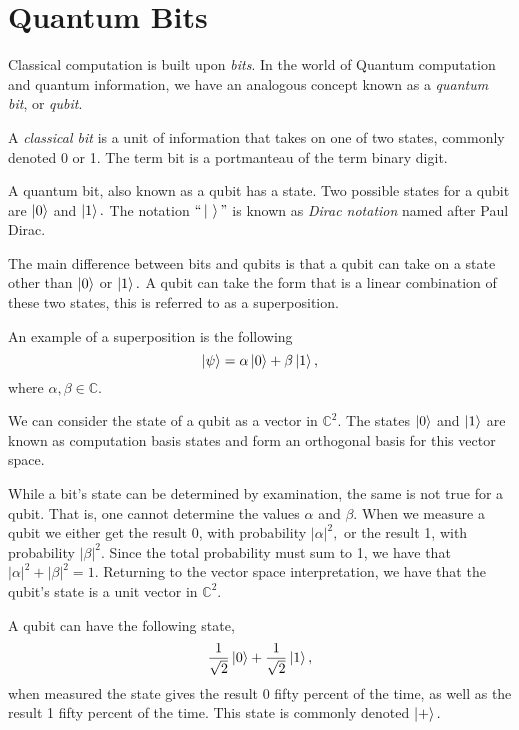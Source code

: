 \section{Quantum Bits}

Classical computation is built upon \textit{bits}. In the world of Quantum computation and quantum information, we have an analogous concept known as a \textit{quantum bit}, or \textit{qubit}.

\begin{definition}
	A \textit{classical bit} is a unit of information that takes on one of two states, commonly denoted 0 or 1. The term bit is a portmanteau of the term binary digit.
\end{definition}

\begin{definition}
	A quantum bit, also known as a qubit has a state. Two possible states for a qubit are $ \ket{0} $ and $ \ket{1}. $ The notation $ ``\ket{  \ }" $ is known as \textit{Dirac notation} named after Paul Dirac.
\end{definition}

The main difference between bits and qubits is that a qubit can take on a state other than $ \ket{0} $ or $ \ket{1}. $ A qubit can take the form that is a linear combination of these two states, this is referred to as a superposition.

An example of a superposition is the following
\begin{equation}\label{superpos_eq}
\ket{\psi} = \alpha \ket{0} + \beta \ket{1},
\end{equation}
where $ \alpha, \beta \in \mathbb{C}. $

We can consider the state of a qubit as a vector in $ \mathbb{C}^2. $ The states $ \ket{0} $ and $ \ket{1} $ are known as computation basis states and form an orthogonal basis for this vector space.

While a bit's state can be determined by examination, the same is not true for a qubit. That is, one cannot determine the values $ \alpha $ and $ \beta. $ When we measure a qubit we either get the result 0, with probability $ \left| \alpha \right|^2, $ or the result 1, with probability $ \left| \beta \right|^2. $ Since the total probability must sum to 1, we have that $ \left| \alpha \right|^2 + \left| \beta \right|^2 = 1. $ Returning to the vector space interpretation, we have that the qubit's state is a unit vector in $ \mathbb{C}^2. $

\begin{example}
	A qubit can have the following state, \[ \frac{1}{\sqrt{2}}\ket{0} + \frac{1}{\sqrt{2}}\ket{1}, \] when measured the state gives the result 0 fifty percent of the time, as well as the result 1 fifty percent of the time. This state is commonly denoted $ \ket{+}. $
\end{example}

